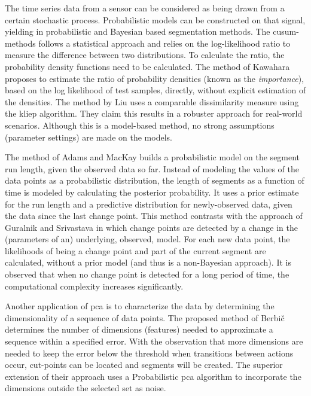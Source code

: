 The time series data from a sensor can be considered as being drawn from a certain stochastic process.
Probabilistic models can be constructed on that signal, yielding in probabilistic and Bayesian based segmentation methods.
The \gls{cusum}-methods follows a statistical approach and relies on the log-likelihood ratio \cite{gustafsson1996marginalized} to measure the difference between two distributions.
To calculate the ratio, the probability density functions need to be calculated.
The method of Kawahara \etal \cite{kawahara2009change} proposes to estimate the ratio of probability densities (known as the \emph{importance}), based on the log likelihood of test samples, directly, without explicit estimation of the densities.
The method by Liu \etal \cite{liu2013change} uses a comparable dissimilarity measure using the \gls{kliep} algorithm.
They claim this results in a robuster approach for real-world scenarios.
Although this is a model-based method, no strong assumptions (parameter settings) are made on the models.

The method of Adams and MacKay \cite{adams2007bayesian} builds a probabilistic model on the segment run length, given the observed data so far.
Instead of modeling the values of the data points as a probabilistic distribution, the length of segments as a function of time is modeled by calculating the posterior probability.
It uses a prior estimate for the run length and a predictive distribution for newly-observed data, given the data since the last change point.
This method contrasts with the approach of Guralnik and Srivastava \cite{guralnik1999event} in which change points are detected by a change in the (parameters of an) underlying, observed, model.
For each new data point, the likelihoods of being a change point and part of the current segment are calculated, without a prior model (and thus is a non-Bayesian approach).
It is observed that when no change point is detected for a long period of time, the computational complexity increases significantly.

Another application of \gls{pca} is to characterize the data by determining the dimensionality of a sequence of data points.
The proposed method of Berbi\v{c} \etal \cite{barbivc2004segmenting} determines the number of dimensions (features) needed to approximate a sequence within a specified error.
With the observation that more dimensions are needed to keep the error below the threshold when transitions between actions occur, cut-points can be located and segments will be created.
The superior extension of their approach uses a Probabilistic \gls{pca} algorithm to incorporate the dimensions outside the selected set as noise.

